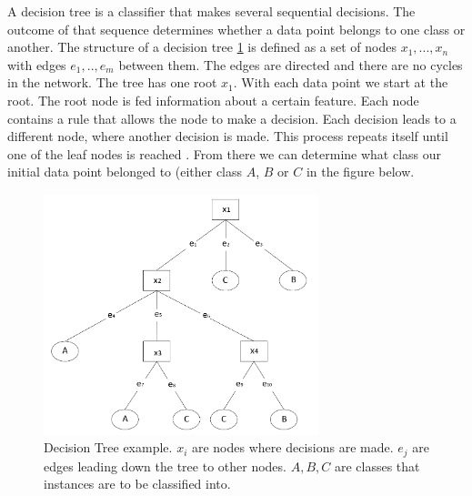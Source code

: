 A decision tree is a classifier that makes several sequential decisions. The outcome of that sequence determines whether a data point belongs to one class or another. The structure of a decision tree \ref{fig:DT} is defined as a set of nodes ${x_1, ... , x_n}$ with edges ${e_1, .., e_{m}}$ between them. The edges are directed and there are no cycles in the network. The tree has one root $x_1$. With each data point we start at the root. The root node is fed information about a certain feature. Each node contains a rule that allows the node to make a decision. Each decision leads to a different node, where another decision is made. This process repeats itself until one of the leaf nodes is reached \cite{safavian1991survey}. From there we can determine what class our initial data point belonged to (either class $A$, $B$ or $C$ in the figure below. 
\begin{figure}[H]
    \includegraphics[width=80mm]{./img/decisiontree.png}
    \caption{\footnotesize{Decision Tree example. $x_i$ are nodes where decisions are made. $e_j$ are edges leading down the tree to other nodes. $A,B,C$ are classes that instances are to be classified into.}}
    \label{fig:DT}
\end{figure}

